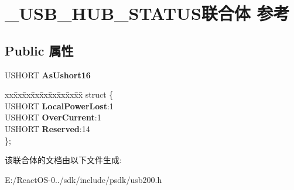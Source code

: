 \hypertarget{union___u_s_b___h_u_b___s_t_a_t_u_s}{}\section{\+\_\+\+U\+S\+B\+\_\+\+H\+U\+B\+\_\+\+S\+T\+A\+T\+U\+S联合体 参考}
\label{union___u_s_b___h_u_b___s_t_a_t_u_s}
\subsection*{Public 属性}
\begin{DoxyCompactItemize}
\item 
\mbox{\label{union___u_s_b___h_u_b___s_t_a_t_u_s_a9447a519b07c710e0fa18e112b1b9f7e}} 
U\+S\+H\+O\+RT {\bfseries As\+Ushort16}
\item 
\mbox{\label{union___u_s_b___h_u_b___s_t_a_t_u_s_a70d2617960c7ab697c4aafca13134875}} 
\begin{tabbing}
xx\=xx\=xx\=xx\=xx\=xx\=xx\=xx\=xx\=\kill
struct \{\\
\>USHORT {\bfseries LocalPowerLost}:1\\
\>USHORT {\bfseries OverCurrent}:1\\
\>USHORT {\bfseries Reserved}:14\\
\}; \\

\end{tabbing}\end{DoxyCompactItemize}


该联合体的文档由以下文件生成\+:\begin{DoxyCompactItemize}
\item 
E\+:/\+React\+O\+S-\/0../sdk/include/psdk/usb200.\+h\end{DoxyCompactItemize}
